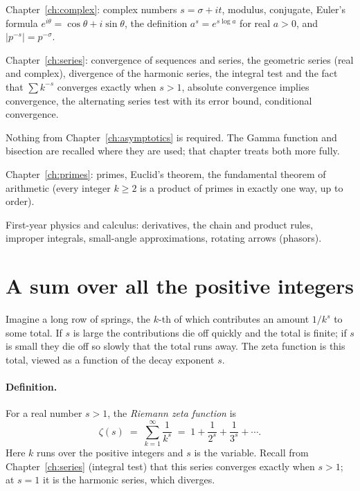 \begin{prerequisites}
\item Chapter~\ref{ch:complex}: complex numbers $s=\sigma+it$, modulus, conjugate, Euler's formula $e^{i\theta}=\cos\theta+i\sin\theta$, the definition $a^s=e^{s\log a}$ for real $a>0$, and $|p^{-s}|=p^{-\sigma}$.
\item Chapter~\ref{ch:series}: convergence of sequences and series, the geometric series (real and complex), divergence of the harmonic series, the integral test and the fact that $\sum k^{-s}$ converges exactly when $s>1$, absolute convergence implies convergence, the alternating series test with its error bound, conditional convergence.
\item Nothing from Chapter~\ref{ch:asymptotics} is required. The Gamma function and bisection are recalled where they are used; that chapter treats both more fully.
\item Chapter~\ref{ch:primes}: primes, Euclid's theorem, the fundamental theorem of arithmetic (every integer $k\ge2$ is a product of primes in exactly one way, up to order).
\item First-year physics and calculus: derivatives, the chain and product rules, improper integrals, small-angle approximations, rotating arrows (phasors).
\end{prerequisites}

\section{A sum over all the positive integers}\label{sec:zeta-real}

Imagine a long row of springs, the $k$-th of which contributes an amount $1/k^s$ to some total. If $s$ is large the contributions die off quickly and the total is finite; if $s$ is small they die off so slowly that the total runs away. The zeta function is this total, viewed as a function of the decay exponent $s$.

\paragraph{Definition.} For a real number $s>1$, the \emph{Riemann zeta function} is
\begin{equation}
\zeta(s) \;=\; \sum_{k=1}^{\infty}\frac{1}{k^s}
\;=\; 1+\frac{1}{2^s}+\frac{1}{3^s}+\cdots .
\label{eq:zeta-def}
\end{equation}
Here $k$ runs over the positive integers and $s$ is the variable. Recall from Chapter~\ref{ch:series} (integral test) that this series converges exactly when $s>1$; at $s=1$ it is the harmonic series, which diverges.


